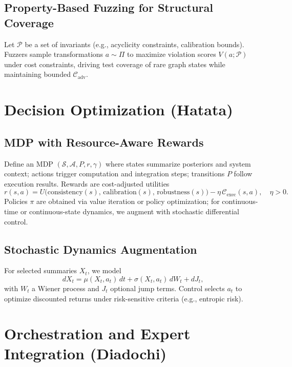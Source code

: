 \documentclass[12pt,a4paper]{article}
\begin{document}
\subsection{Property-Based Fuzzing for Structural Coverage}
Let $\mathcal{P}$ be a set of invariants (e.g., acyclicity constraints, calibration bounds). Fuzzers sample transformations $a\sim \Pi$ to maximize violation scores $V(a;\mathcal{P})$ under cost constraints, driving test coverage of rare graph states while maintaining bounded $\mathcal{C}_{\text{adv}}$.

\section{Decision Optimization (Hatata)}
\subsection{MDP with Resource-Aware Rewards}
Define an MDP $(\mathcal{S},\mathcal{A},P,r,\gamma)$ where states summarize posteriors and system context; actions trigger computation and integration steps; transitions $P$ follow execution results. Rewards are cost-adjusted utilities
\begin{equation}
\label{eq:reward}
 r(s,a) = U\bigl(\text{consistency}(s),\, \text{calibration}(s),\, \text{robustness}(s)\bigr) - \eta\, \mathcal{C}_{\text{exec}}(s,a), \quad \eta>0.
\end{equation}
Policies $\pi$ are obtained via value iteration or policy optimization; for continuous-time or continuous-state dynamics, we augment with stochastic differential control.

\subsection{Stochastic Dynamics Augmentation}
For selected summaries $X_t$, we model
\begin{equation}
\label{eq:sde}
 dX_t = \mu(X_t, a_t)\,dt + \sigma(X_t,a_t)\, dW_t + dJ_t,
\end{equation}
with $W_t$ a Wiener process and $J_t$ optional jump terms. Control selects $a_t$ to optimize discounted returns under risk-sensitive criteria (e.g., entropic risk).

\section{Orchestration and Expert Integration (Diadochi)}
\end{document}
